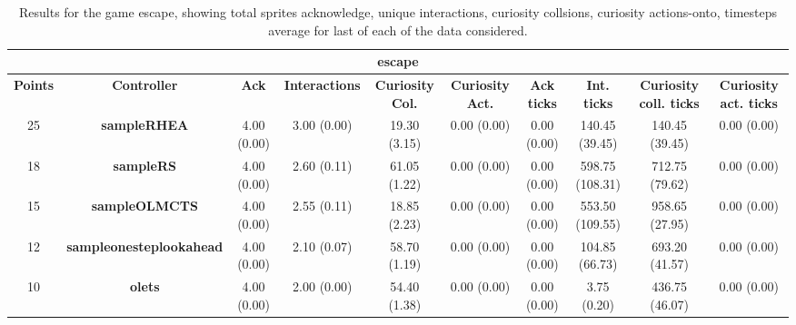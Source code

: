 \begin{table*}[!t]
\begin{center}
\begin{adjustbox}{width=1\textwidth}
\begin{tabular}{|c|c|c|c|c|c|c|c|c|c|}
\multicolumn{10}{c}{\textbf{escape}}\\
\hline
\textbf{Points} & \textbf{Controller} & \textbf{Ack} & \textbf{Interactions} & \textbf{Curiosity Col.} & \textbf{Curiosity Act.} & \textbf{Ack ticks} & \textbf{Int. ticks} & \textbf{Curiosity coll. ticks} & \textbf{Curiosity act. ticks}\\
\hline
25 & \textbf{sampleRHEA} & 4.00 (0.00) & 3.00 (0.00) & 19.30 (3.15) & 0.00 (0.00) & 0.00 (0.00) & 140.45 (39.45) & 140.45 (39.45) & 0.00 (0.00)
 \\
\hline
18 & \textbf{sampleRS} & 4.00 (0.00) & 2.60 (0.11) & 61.05 (1.22) & 0.00 (0.00) & 0.00 (0.00) & 598.75 (108.31) & 712.75 (79.62) & 0.00 (0.00)
 \\
\hline
15 & \textbf{sampleOLMCTS} & 4.00 (0.00) & 2.55 (0.11) & 18.85 (2.23) & 0.00 (0.00) & 0.00 (0.00) & 553.50 (109.55) & 958.65 (27.95) & 0.00 (0.00)
 \\
\hline
12 & \textbf{sampleonesteplookahead} & 4.00 (0.00) & 2.10 (0.07) & 58.70 (1.19) & 0.00 (0.00) & 0.00 (0.00) & 104.85 (66.73) & 693.20 (41.57) & 0.00 (0.00)
 \\
\hline
10 & \textbf{olets} & 4.00 (0.00) & 2.00 (0.00) & 54.40 (1.38) & 0.00 (0.00) & 0.00 (0.00) & 3.75 (0.20) & 436.75 (46.07) & 0.00 (0.00)
 \\
\hline
\end{tabular}
\end{adjustbox}
\caption{Results for the game escape, showing total sprites acknowledge, unique interactions, curiosity collsions, curiosity actions-onto, timesteps average for last of each of the data considered.}
\label{tab:weights}
\end{center}
\end{table*}
